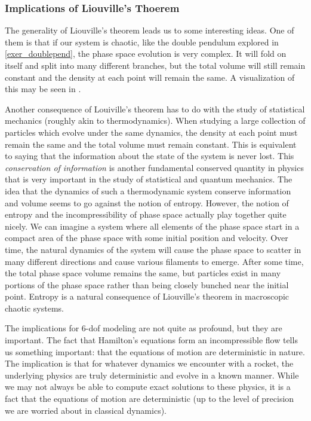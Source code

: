 \subsubsection{Implications of Liouville's Thoerem}

The generality of Liouville's theorem leads us to some interesting ideas. One of them is that if our system is chaotic, like the double pendulum explored in \autoref{exer_doublepend}, the phase space evolution is very complex. It will fold on itself and split into many different branches, but the total volume will still remain constant and the density at each point will remain the same. A visualization of this may be seen in \cite{maciej_matyka_phase_2021}.

Another consequence of Louiville's theorem has to do with the study of statistical mechanics (roughly akin to thermodynamics). When studying a large collection of particles which evolve under the same dynamics, the density at each point must remain the same and the total volume must remain constant. This is equivalent to saying that the information about the state of the system is never lost. This \textit{conservation of information} is another fundamental conserved quantity in physics that is very important in the study of statistical and quantum mechanics.  
The idea that the dynamics of such a thermodynamic system conserve information and volume seems to go against the notion of entropy. However, the notion of entropy and the incompressibility of phase space actually play together quite nicely. We can imagine a system where all elements of the phase space start in a compact area of the phase space with some initial position and velocity. Over time, the natural dynamics of the system will cause the phase space to scatter in many different directions and cause various filaments to emerge. After some time, the total phase space volume remains the same, but particles exist in many portions of the phase space rather than being closely bunched near the initial point. Entropy is a natural consequence of Liouville's theorem in macroscopic chaotic systems.

The implications for 6-\gls{dof} modeling are not quite as profound, but they are important. The fact that Hamilton's equations form an incompressible flow tells us something important: that the equations of motion are deterministic in nature. The implication is that for whatever dynamics we encounter with a rocket, the underlying physics are truly deterministic and evolve in a known manner. While we may not always be able to compute exact solutions to these physics, it is a fact that the equations of motion are deterministic (up to the level of precision we are worried about in classical dynamics).

